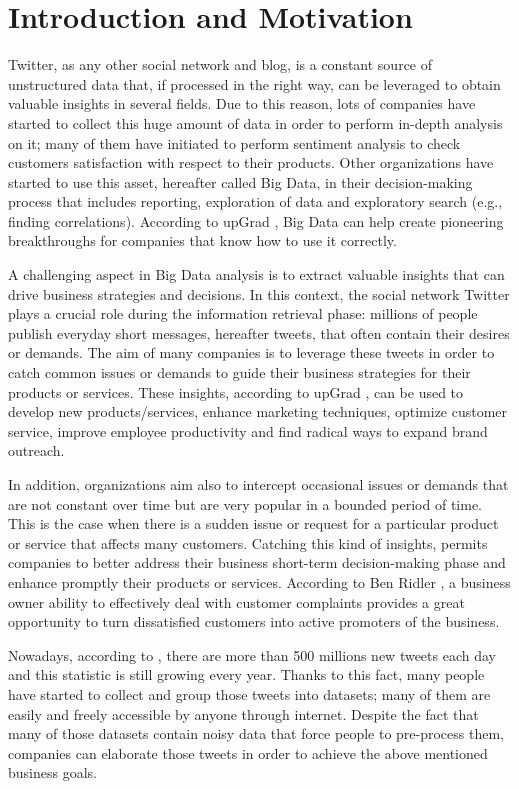 \section{Introduction and Motivation}
\label{sec:introduction}
Twitter, as any other social network and blog, is a constant source of unstructured data that, if processed in the right way, can be leveraged to obtain valuable insights in several fields. Due to this reason, lots of companies have started to collect this huge amount of data in order to perform in-depth analysis on it; many of them have initiated to perform sentiment analysis to check customers satisfaction with respect to their products. Other organizations have started to use this asset, hereafter called Big Data, in their decision-making process that includes reporting, exploration of data and exploratory search (e.g., finding correlations). According to upGrad \cite{upGrad}, Big Data can help create pioneering breakthroughs for companies that know how to use it correctly.

A challenging aspect in Big Data analysis is to extract valuable insights that can drive business strategies and decisions. In this context, the social network Twitter plays a crucial role during the information retrieval phase: millions of people publish everyday short messages, hereafter tweets, that often contain their desires or demands. The aim of many companies is to leverage these tweets in order to catch common issues or demands to guide their business strategies for their products or services. These insights, according to upGrad \cite{upGrad}, can be used to develop new products/services, enhance marketing techniques, optimize customer service, improve employee productivity and find radical ways to expand brand outreach.

In addition, organizations aim also to intercept occasional issues or demands that are not constant over time but are very popular in a bounded period of time. This is the case when there is a sudden issue or request for a particular product or service that affects many customers. Catching this kind of insights, permits companies to better address their business short-term decision-making phase and enhance promptly their products or services. According to Ben Ridler \cite{customer-satistaction}, a business owner ability to effectively deal with customer complaints provides a great opportunity to turn dissatisfied customers into active promoters of the business.

Nowadays, according to \cite{twitter-stats}, there are more than 500 millions new tweets each day and this statistic is still growing every year. Thanks to this fact, many people have started to collect and group those tweets into datasets; many of them are easily and freely accessible by anyone through internet. Despite the fact that many of those datasets contain noisy data that force people to pre-process them, companies can elaborate those tweets in order to achieve the above mentioned business goals.

